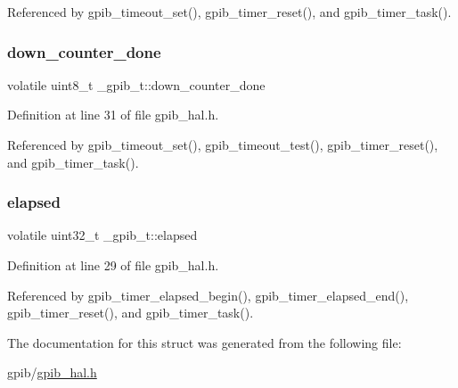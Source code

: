 Referenced by gpib\+\_\+timeout\+\_\+set(), gpib\+\_\+timer\+\_\+reset(), and gpib\+\_\+timer\+\_\+task().

\mbox{\label{struct__gpib__t_af2622dd8668ecb24c42a2da2d8956538}} 
\subsubsection{\texorpdfstring{down\+\_\+counter\+\_\+done}{down\_counter\_done}}
{\footnotesize\ttfamily volatile uint8\+\_\+t \+\_\+gpib\+\_\+t\+::down\+\_\+counter\+\_\+done}



Definition at line 31 of file gpib\+\_\+hal.\+h.



Referenced by gpib\+\_\+timeout\+\_\+set(), gpib\+\_\+timeout\+\_\+test(), gpib\+\_\+timer\+\_\+reset(), and gpib\+\_\+timer\+\_\+task().

\mbox{\label{struct__gpib__t_a99a38aef880eb075f625f33d7bac31dd}} 
\subsubsection{\texorpdfstring{elapsed}{elapsed}}
{\footnotesize\ttfamily volatile uint32\+\_\+t \+\_\+gpib\+\_\+t\+::elapsed}



Definition at line 29 of file gpib\+\_\+hal.\+h.



Referenced by gpib\+\_\+timer\+\_\+elapsed\+\_\+begin(), gpib\+\_\+timer\+\_\+elapsed\+\_\+end(), gpib\+\_\+timer\+\_\+reset(), and gpib\+\_\+timer\+\_\+task().



The documentation for this struct was generated from the following file\+:\begin{DoxyCompactItemize}
\item 
gpib/\hyperlink{gpib__hal_8h}{gpib\+\_\+hal.\+h}\end{DoxyCompactItemize}
